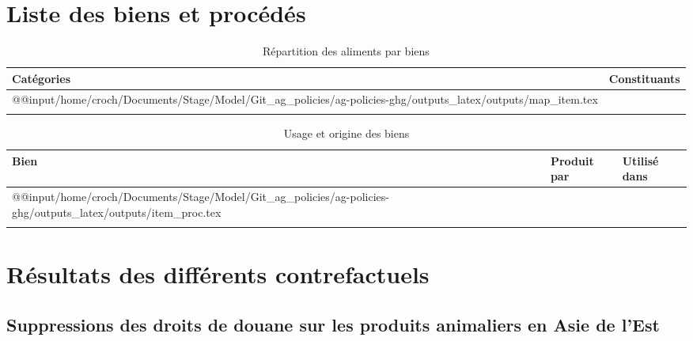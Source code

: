 \section{Liste des biens et procédés}\label{annexe:item_pord}

\begin{longtable}[h]{p{1.5in}p{4.5in}}
    \textbf{Catégories} & \textbf{Constituants} \\         \hline
    \endfirsthead
    \endhead
    \csname @@input\endcsname /home/croch/Documents/Stage/Model/Git_ag_policies/ag-policies-ghg/outputs_latex/outputs/map_item.tex
    \hline                                      \\
    \caption{Répartition des aliments par biens}
\end{longtable}

\begin{longtable}[h]{p{1.5in}p{2.5in}p{1.8in}}
    \textbf{Bien} & \textbf{Produit par} & \textbf{Utilisé dans} \\         \hline
    \endfirsthead
    \endhead
    \csname @@input\endcsname /home/croch/Documents/Stage/Model/Git_ag_policies/ag-policies-ghg/outputs_latex/outputs/item_proc.tex
    \hline                                                       \\
    \caption{Usage et origine des biens}
\end{longtable}

\newpage
\section{Résultats des différents contrefactuels}
\subsection{Suppressions des droits de douane sur les produits animaliers en Asie de l'Est}\label{annexe:ae_anp}

